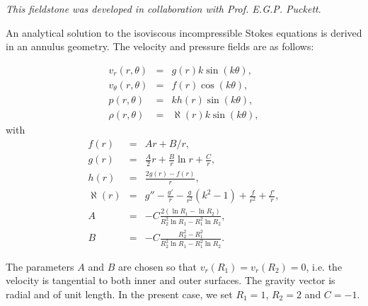 

{\sl This fieldstone was developed in collaboration with Prof. E.G.P. Puckett}. 

An analytical solution to the
isoviscous incompressible Stokes equations is derived in an annulus geometry.
The velocity and pressure fields are as follows:

\begin{eqnarray}
v_r(r,\theta)     &=&  g(r) k \sin(k\theta), \\
v_\theta(r,\theta)&=&  f(r) \cos(k \theta), \\ 
p(r,\theta)       &=&  k h(r) \sin(k \theta), \\
\rho (r,\theta)   &=& \aleph(r) k \sin (k \theta), 
\end{eqnarray}
with
\begin{eqnarray}
f(r)&=&Ar+B/r, \\
g(r) &=& \frac{A}{2}r  +  \frac{B}{r} \ln r + \frac{C}{r}, \\
h(r)&=& \frac{2g(r)-f(r)}{r},  \\
\aleph(r) &=& g'' - \frac{g'}{r}  - \frac{g}{r^2} (k^2 - 1)  + \frac{f}{r^2}   + \frac{f'}{r}, \\
A &=& -C\frac{2(\ln R_1 - \ln R_2)} { R_2^2 \ln R_1  - R_1^2 \ln R_2}, \\
B &=& -C \frac{R_2^2-R_1^2}{R_2^2 \ln R_1 - R_1^2 \ln R_2}.
\end{eqnarray}

The parameters $A$ and $B$ are chosen so that $v_r(R_1)=v_r(R_2)=0$, i.e.
the velocity is tangential to both inner and outer surfaces.
The gravity vector is radial and of unit length.
In the present case, we set $R_1=1$, $R_2=2$ and $C=-1$. 

